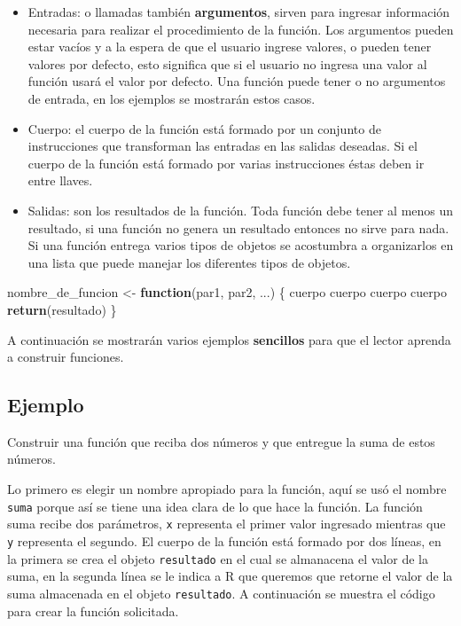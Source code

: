 \documentclass[10pt,]{krantz}
\makeatletter
\newenvironment{Shaded}{\begin{snugshade}}{\end{snugshade}}
\newcommand{\KeywordTok}[1]{\textcolor[rgb]{0.13,0.29,0.53}{\textbf{#1}}}
\newcommand{\StringTok}[1]{\textcolor[rgb]{0.31,0.60,0.02}{#1}}
\newcommand{\ControlFlowTok}[1]{\textcolor[rgb]{0.13,0.29,0.53}{\textbf{#1}}}
\newcommand{\NormalTok}[1]{#1}
\providecommand{\tightlist}{%
  \setlength{\itemsep}{0pt}\setlength{\parskip}{0pt}}
\let\proglang=\textsf
\newenvironment{kframe}{%
\medskip{}
\setlength{\fboxsep}{.8em}
 \def\at@end@of@kframe{}%
 \ifinner\ifhmode%
  \def\at@end@of@kframe{\end{minipage}}%
  \begin{minipage}{\columnwidth}%
 \fi\fi%
 \def\FrameCommand##1{\hskip\@totalleftmargin \hskip-\fboxsep
 \colorbox{shadecolor}{##1}\hskip-\fboxsep
     \hskip-\linewidth \hskip-\@totalleftmargin \hskip\columnwidth}%
 \MakeFramed {\advance\hsize-\width
   \@totalleftmargin\z@ \linewidth\hsize
   \@setminipage}}%
 {\par\unskip\endMakeFramed%
 \at@end@of@kframe}
\renewenvironment{Shaded}{\begin{kframe}}{\end{kframe}}
\makeatother
\begin{document}
\begin{itemize}
\tightlist
\item
  Entradas: o llamadas también \textbf{argumentos}, sirven para ingresar
  información necesaria para realizar el procedimiento de la función.
  Los argumentos pueden estar vacíos y a la espera de que el usuario
  ingrese valores, o pueden tener valores por defecto, esto significa
  que si el usuario no ingresa una valor al función usará el valor por
  defecto. Una función puede tener o no argumentos de entrada, en los
  ejemplos se mostrarán estos casos.
\item
  Cuerpo: el cuerpo de la función está formado por un conjunto de
  instrucciones que transforman las entradas en las salidas deseadas. Si
  el cuerpo de la función está formado por varias instrucciones éstas
  deben ir entre llaves.
\item
  Salidas: son los resultados de la función. Toda función debe tener al
  menos un resultado, si una función no genera un resultado entonces no
  sirve para nada. Si una función entrega varios tipos de objetos se
  acostumbra a organizarlos en una lista que puede manejar los
  diferentes tipos de objetos.
\end{itemize}

\begin{Shaded}
\begin{Highlighting}[]
\NormalTok{nombre_de_funcion <-}\StringTok{ }\ControlFlowTok{function}\NormalTok{(par1, par2, ...) \{}
\NormalTok{  cuerpo}
\NormalTok{  cuerpo}
\NormalTok{  cuerpo}
\NormalTok{  cuerpo}
  \KeywordTok{return}\NormalTok{(resultado)}
\NormalTok{\}}
\end{Highlighting}
\end{Shaded}

A continuación se mostrarán varios ejemplos \textbf{sencillos} para que
el lector aprenda a construir funciones.

\subsection*{Ejemplo}\label{ejemplo-20}


Construir una función que reciba dos números y que entregue la suma de
estos números.

Lo primero es elegir un nombre apropiado para la función, aquí se usó el
nombre \texttt{suma} porque así se tiene una idea clara de lo que hace
la función. La función suma recibe dos parámetros, \texttt{x} representa
el primer valor ingresado mientras que \texttt{y} representa el segundo.
El cuerpo de la función está formado por dos líneas, en la primera se
crea el objeto \texttt{resultado} en el cual se almanacena el valor de
la suma, en la segunda línea se le indica a \proglang{R} que queremos
que retorne el valor de la suma almacenada en el objeto
\texttt{resultado}. A continuación se muestra el código para crear la
función solicitada.
\end{document}

